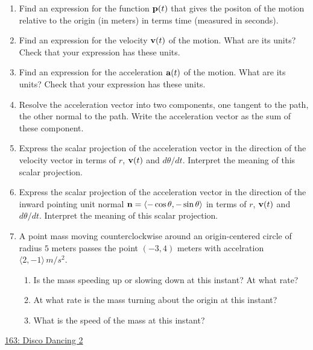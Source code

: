\documentclass{ximera}
\begin{document}
\begin{enumerate}
\item Find an expression for the function ${\bf p}(t)$ that gives the positon of the motion relative to the origin (in meters) in terms time (measured in seconds).

\item Find an expression for the velocity ${\bf v}(t)$ of the motion. What are its units? Check that your expression has these units.

\item Find an expression for the acceleration ${\bf a}(t)$ of the motion. What are its units? Check that your expression has these units.

\item Resolve the acceleration vector into two components, one tangent to the path, the other normal to the path. Write the acceleration vector as the sum of these component.

\item Express the scalar projection of the acceleration vector in the direction of the velocity vector in terms of $r$, ${\bf v}(t)$ and $d\theta/dt$. Interpret the meaning of this scalar projection.

\item Express the scalar projection of the acceleration vector in the direction of the inward pointing unit normal ${\bf n} = \langle -\cos\theta, -\sin\theta \rangle$ in terms of $r$, ${\bf v}(t)$ and $d\theta/dt$. Interpret the meaning of this scalar projection.

\item A point mass moving counterclockwise around an origin-centered circle of radius $5$ meters passes the point $(-3,4)$ meters with accelration $\langle 2, -1\rangle \, m/s^2$.  

\begin{enumerate}
\item Is the mass speeding up or slowing down at this instant? At what rate?

\item At what rate is the mass turning about the origin at this instant?

\item What is the speed of the mass at this instant?
\end{enumerate}

\end{enumerate}


\begin{question}  \label{Q6756456443gg}

\begin{onlineOnly}
    \begin{center}
\end{center}
\end{onlineOnly}

\href{https://www.geogebra.org/classic/m38mqcpa}{163: Disco Dancing 2}

\end{question}
\end{document}
